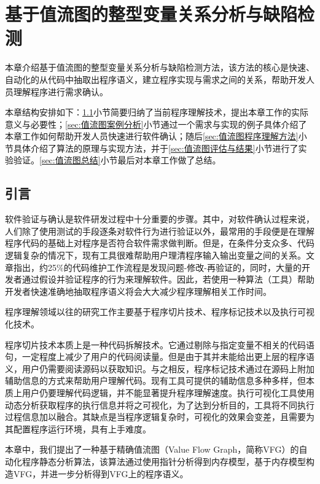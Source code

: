 
\chapter{基于值流图的整型变量关系分析与缺陷检测}

本章介绍基于值流图的整型变量关系分析与缺陷检测方法，该方法的核心是快速、自动化的从代码中抽取出程序语义，建立程序实现与需求之间的关系，帮助开发人员理解程序进行需求确认。

本章结构安排如下：\ref{sec:值流图引言}小节简要归纳了当前程序理解技术，提出本章工作的实际意义与必要性；\ref{sec:值流图案例分析}小节通过一个需求与实现的例子具体介绍了本章工作如何帮助开发人员快速进行软件确认；随后\ref{sec:值流图程序理解方法}小节具体介绍了算法的原理与实现方法，并于\ref{sec:值流图评估与结果}小节进行了实验验证。\ref{sec:值流图总结}小节最后对本章工作做了总结。

\section{引言}
\label{sec:值流图引言}

软件验证与确认是软件研发过程中十分重要的步骤。其中，对软件确认过程来说，人们除了使用测试的手段逐条对软件行为进行验证以外，最常用的手段便是在理解程序代码的基础上对程序是否符合软件需求做判断。但是，在条件分支众多、代码逻辑复杂的情况下，现有工具很难帮助用户理清程序输入输出变量之间的关系。文章指出，约25\%的代码维护工作流程是发现问题-修改-再验证的，同时，大量的开发者通过假设并验证程序的行为来理解软件\cite{maalej2014comprehension}。因此，若使用一种算法（工具）帮助开发者快速准确地抽取程序语义将会大大减少程序理解相关工作时间。

程序理解\cite{boysen1979factors, sackman1968exploratory}领域以往的研究工作主要基于程序切片技术、程序标记技术以及执行可视化技术。

程序切片技术\cite{binkley1996program}本质上是一种代码拆解技术。它通过剔除与指定变量不相关的代码语句，一定程度上减少了用户的代码阅读量。但是由于其并未能给出更上层的程序语义，用户仍需要阅读源码以获取知识。与之相反，程序标记技术\cite{sulir2017labeling}通过在源码上附加辅助信息的方式来帮助用户理解代码。现有工具可提供的辅助信息多种多样，但本质上用户仍要理解代码逻辑，并不能显著提升程序理解速度。执行可视化工具使用动态分析获取程序的执行信息并将之可视化，为了达到分析目的，工具将不同执行过程信息加以融合。其缺点是当程序逻辑复杂时，可视化的效果会变差，且需要为其配置程序运行环境，具有上手难度。 

本章中，我们提出了一种基于精确值流图（Value Flow Graph，简称VFG）的自动化程序静态分析算法，该算法通过使用指针分析得到内存模型，基于内存模型构造VFG，并进一步分析得到VFG上的程序语义。

